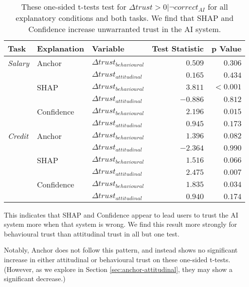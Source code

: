 \begin{table}[htb]
    \centering
    \caption{These one-sided t-tests test for $\Delta trust > 0 | \neg correct_{AI}$ for all explanatory conditions and both tasks. We find that SHAP and Confidence increase unwarranted trust in the AI system.}
    \label{tab:delta-trust-t}
    \begin{tabular}{l l l r r}
        \toprule
        Task & Explanation & Variable & Test Statistic & p Value \\ 
        \midrule
        \emph{Salary} & Anchor & $\Delta trust_{behavioural}$ & $0.509$ & $0.306$ \\
        & & $\Delta trust_{attitudinal}$ & $0.165$ & $0.434$ \\
        & SHAP & $\Delta trust_{behavioural}$ & $\mathbf{3.811}$ & $\mathbf{<0.001}$ \\
        & & $\Delta trust_{attitudinal}$ & $-0.886$ & $0.812$ \\
        & Confidence & $\Delta trust_{behavioural}$ & $\mathbf{2.196}$ & $\mathbf{0.015}$ \\
        & & $\Delta trust_{attitudinal}$ & $0.945$ & $0.173$ \\
        \midrule
        \emph{Credit} & Anchor & $\Delta trust_{behavioural}$ & $1.396$ & $0.082$ \\
        & & $\Delta trust_{attitudinal}$ & $-2.364$ & $0.990$ \\
        & SHAP & $\Delta trust_{behavioural}$ & $1.516$ & $0.066$ \\
        & & $\Delta trust_{attitudinal}$ & $\mathbf{2.475}$ & $\mathbf{0.007}$ \\
        & Confidence & $\Delta trust_{behavioural}$ & $\mathbf{1.835}$ & $\mathbf{0.034}$ \\
        & & $\Delta trust_{attitudinal}$ & $0.940$ & $0.174$ \\
        \bottomrule
    \end{tabular}
\end{table}

This indicates that SHAP and Confidence appear to lead users to trust the AI system more when that system is wrong. We find this result more strongly for behavioural trust than attitudinal trust in all but one test.

Notably, Anchor does not follow this pattern, and instead shows no significant increase in either attitudinal or behavioural trust on these one-sided t-tests. (However, as we explore in Section \ref{sec:anchor-attitudinal}, they may show a significant decrease.)

